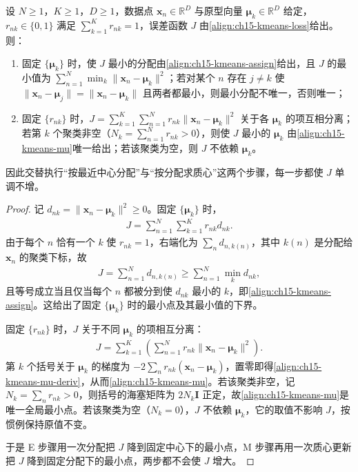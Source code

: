 \documentclass[../../main.tex]{subfiles}
\begin{document}
\begin{proposition}[K 均值算法的两步闭式更新]\label{proposition:ch15-K均值闭式更新}
设 $N\geqslant1$，$K\geqslant1$，$D\geqslant1$，数据点 $\bm{x}_n\in\mathbb{R}^{D}$ 与原型向量 $\bm{\mu}_k\in\mathbb{R}^{D}$ 给定，$r_{nk}\in\{0,1\}$ 满足 $\sum_{k=1}^{K}r_{nk}=1$，误差函数 $J$ 由\eqref{align:ch15-kmeans-loss}给出。则：
\begin{enumerate}
\item 固定 $\{\bm{\mu}_k\}$ 时，使 $J$ 最小的分配由\eqref{align:ch15-kmeans-assign}给出，且 $J$ 的最小值为 $\sum_{n=1}^{N}\min_{k}\|\bm{x}_n-\bm{\mu}_k\|^{2}$；若对某个 $n$ 存在 $j\neq k$ 使 $\|\bm{x}_n-\bm{\mu}_j\|=\|\bm{x}_n-\bm{\mu}_k\|$ 且两者都最小，则最小分配不唯一，否则唯一；
\item 固定 $\{r_{nk}\}$ 时，$J=\sum_{k=1}^{K}\sum_{n=1}^{N}r_{nk}\|\bm{x}_n-\bm{\mu}_k\|^{2}$ 关于各 $\bm{\mu}_k$ 的项互相分离；若第 $k$ 个聚类非空（$N_k=\sum_{n=1}^{N}r_{nk}>0$），则使 $J$ 最小的 $\bm{\mu}_k$ 由\eqref{align:ch15-kmeans-mu}唯一给出；若该聚类为空，则 $J$ 不依赖 $\bm{\mu}_k$。
\end{enumerate}
因此交替执行“按最近中心分配”与“按分配求质心”这两个步骤，每一步都使 $J$ 单调不增。
\end{proposition}
\begin{proof}
记 $d_{nk}=\|\bm{x}_n-\bm{\mu}_k\|^2\geqslant0$。固定 $\{\bm{\mu}_k\}$ 时，
\begin{align*}
J=\sum_{n=1}^{N}\sum_{k=1}^{K}r_{nk}d_{nk}.
\end{align*}
由于每个 $n$ 恰有一个 $k$ 使 $r_{nk}=1$，右端化为 $\sum_{n}d_{n,k(n)}$，其中 $k(n)$ 是分配给 $\bm{x}_n$ 的聚类下标，故
\begin{align*}
J=\sum_{n=1}^{N}d_{n,k(n)}\geqslant\sum_{n=1}^{N}\min_k d_{nk},
\end{align*}
且等号成立当且仅当每个 $n$ 都被分到使 $d_{nk}$ 最小的 $k$，即\eqref{align:ch15-kmeans-assign}。这给出了固定 $\{\bm{\mu}_k\}$ 时的最小点及其最小值的下界。

固定 $\{r_{nk}\}$ 时，$J$ 关于不同 $\bm{\mu}_k$ 的项相互分离：
\begin{align*}
J=\sum_{k=1}^{K}\left(\sum_{n=1}^{N}r_{nk}\|\bm{x}_n-\bm{\mu}_k\|^{2}\right).
\end{align*}
第 $k$ 个括号关于 $\bm{\mu}_k$ 的梯度为 $-2\sum_n r_{nk}(\bm{x}_n-\bm{\mu}_k)$，置零即得\eqref{align:ch15-kmeans-mu-deriv}，从而\eqref{align:ch15-kmeans-mu}。若该聚类非空，记 $N_k=\sum_n r_{nk}>0$，则括号的海塞矩阵为 $2N_k\bm{I}$ 正定，故\eqref{align:ch15-kmeans-mu}是唯一全局最小点。若该聚类为空（$N_k=0$），$J$ 不依赖 $\bm{\mu}_k$，它的取值不影响 $J$，按惯例保持原值不变。

于是 E 步骤用一次分配把 $J$ 降到固定中心下的最小点，M 步骤再用一次质心更新把 $J$ 降到固定分配下的最小点，两步都不会使 $J$ 增大。
\end{proof}
\end{document}
